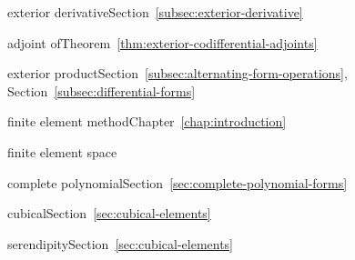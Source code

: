 \par\noindent\hspace*{0em}\label{index:exterior-derivative}{exterior derivative}\quad Section~\ref{subsec:exterior-derivative}

\par\noindent\hspace*{1em}\label{index:exterior-derivative-adjoint-of}{adjoint of}\quad Theorem~\ref{thm:exterior-codifferential-adjoints}

\par\noindent\hspace*{0em}\label{index:exterior-product}{exterior product}\quad Section~\ref{subsec:alternating-form-operations}, Section~\ref{subsec:differential-forms}

\par\noindent\hspace*{0em}\label{index:finite-element-method}{finite element method}\quad Chapter~\ref{chap:introduction}

\par\noindent\hspace*{0em}\label{index:finite-element-space}{finite element space}

\par\noindent\hspace*{1em}\label{index:finite-element-space-complete-polynomial}{complete polynomial}\quad Section~\ref{sec:complete-polynomial-forms}

\par\noindent\hspace*{1em}\label{index:finite-element-space-cubical}{cubical}\quad Section~\ref{sec:cubical-elements}

\par\noindent\hspace*{1em}\label{index:finite-element-space-serendipity}{serendipity}\quad Section~\ref{sec:cubical-elements}

